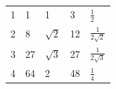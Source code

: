 \documentclass{standalone}
\begin{document}
\begin{tabularx}{5in}{ |*{5}{Y|} }
  \hline
   &  &  &  &  \\
   & 1 & 1 & 3 & $\textstyle\frac{1}{2}$ \\
   & 8 & $\sqrt 2$ & 12 & $\textstyle\frac{1}{2 \sqrt 2}$ \\
   & 27 & $\sqrt 3$ & 27 & $\textstyle\frac{1}{2 \sqrt 3}$ \\
   & 64 & 2 & 48 & $\textstyle\frac{1}{4}$ \\
  \hline
\end{tabularx}
\end{document}
